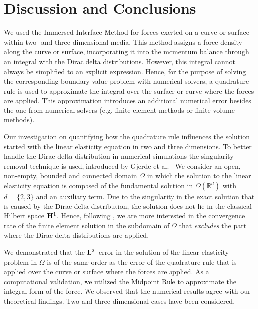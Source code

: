 \documentclass[pdflatex,sn-mathphys-num]{sn-jnl}
\newtheorem*{lemma star}{Lemma}
\begin{document}
\section{Discussion and Conclusions}
\label{sec:5}
We used the Immersed Interface Method for forces exerted on a curve or surface within two- and three-dimensional media. This method assigns a force density along the curve or surface, incorporating it into the momentum balance through an integral with the Dirac delta distributions. However, this integral cannot always be simplified to an explicit expression. Hence, for the purpose of solving the corresponding boundary value problem with numerical solvers, a quadrature rule is used to approximate the integral over the surface or curve where the forces are applied. This approximation introduces an additional numerical error besides the one from numerical solvers (e.g. finite-element methods or finite-volume methods).

Our investigation on quantifying how the quadrature rule influences the solution started with the linear elasticity equation in two and three dimensions. To better handle the Dirac delta distribution in numerical simulations the singularity removal technique is used, introduced by Gjerde et al. \cite{Gjerde_2019}. We consider an open, non-empty, bounded and connected domain $\Omega$ in which the solution to the linear elasticity equation is composed of the fundamental solution in $\Omega(\mathbb{R}^{d})$ with $d=\{2,3\}$ and an auxiliary term. Due to the singularity in the exact solution that is caused by the Dirac delta distribution, the solution does not lie in the classical Hilbert space ${\bf H}^1$. Hence, following \cite{K_ppl_2014,Bertoluzza_2017}, we are more interested in the convergence rate of the finite element solution in the subdomain of $\Omega$ that \textit{excludes} the part where the Dirac delta distributions are applied.

We demonstrated that the ${\bf L}^2$--error in the solution of the linear elasticity problem in $\Omega$ is of the same order as the error of the quadrature rule that is applied over the curve or surface where the forces are applied. As a computational validation, we utilized the Midpoint Rule to approximate the integral form of the force. We observed that the numerical results agree with our theoretical findings. Two-and three-dimensional cases have been considered.
\end{document}
